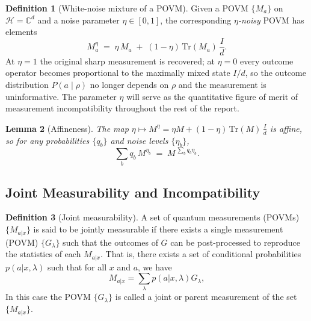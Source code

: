 \documentclass[oneside, a4paper, onecolumn, 11pt]{article}
\theoremstyle{definition}
\newtheorem{definition}{Definition}[section]
\theoremstyle{plain}
\newtheorem{lemma}[definition]{Lemma}
\theoremstyle{remark}
\begin{document}
\begin{definition}[White-noise mixture of a POVM]
\label{def:white-noise}
Given a POVM $\{M_a\}$ on $\mathcal{H} = \mathbb{C}^{d}$ and a noise
parameter $\eta \in [0, 1]$, the corresponding \emph{$\eta$-noisy}
POVM has elements
\begin{equation}
  M^{\eta}_{a} \;=\; \eta\, M_{a} \;+\; (1 - \eta)\, \text{Tr}(M_a)\,
                     \frac{I}{d}.
  \label{eq:noisy-povm}
\end{equation}
At $\eta = 1$ the original sharp measurement is recovered; at
$\eta = 0$ every outcome operator becomes proportional to the
maximally mixed state $I/d$, so the outcome distribution
$P(a \mid \rho)$ no longer depends on $\rho$ and the measurement is
uninformative. The parameter $\eta$ will serve as the quantitative
figure of merit of measurement incompatibility throughout the rest of
the report.
\end{definition}

\begin{lemma}[Affineness]
The map $\eta \mapsto M^\eta = \eta M + (1-\eta)\,\mathrm{Tr}(M)\,\frac{I}{d}$ is affine, so for any probabilities $\{q_b\}$ and noise levels $\{\eta_b\}$,
\[
\sum_b q_b\, M^{\eta_b} \;=\; M^{\,\sum_b q_b \eta_b}.
\]
\end{lemma}


\subsection{Joint Measurability and Incompatibility}

\begin{definition}[Joint measurability] \label{def:jm}
  A set of quantum measurements (POVMs) $\{ M_{a|x} \}$ is said to be jointly measurable if there exists a single measurement (POVM) $\{G_\lambda\}$ such that the outcomes of $G$ can be post-processed to reproduce the statistics of each $M_{a|x}$.
  That is, there exists a set of conditional probabilities $p(a|x, \lambda)$ such that for all $x$ and $a$, we have
  \begin{equation}
    M_{a|x} = \sum_{\lambda} p(a|x, \lambda) G_{\lambda},
  \end{equation}
  In this case the POVM $\{G_\lambda\}$ is called a joint or parent
  measurement of the set $\{M_{a|x}\}$.
\end{definition}
\end{document}
